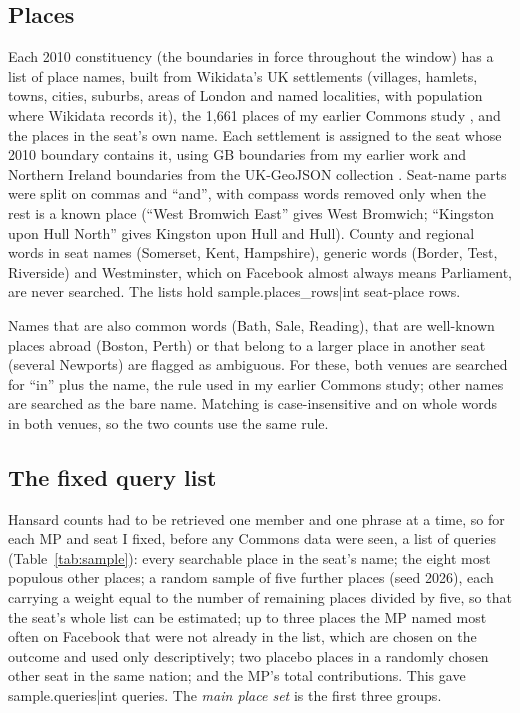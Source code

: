 \documentclass[11pt,a4paper]{article}
\begin{document}
\subsection{Places}
Each 2010 constituency (the boundaries in force throughout the window) has a list of place names, built from Wikidata's UK settlements \citep{wikidata2026} (villages, hamlets, towns, cities, suburbs, areas of London and named localities, with population where Wikidata records it), the 1,661 places of my earlier Commons study \citep{hotham2026a}, and the places in the seat's own name. Each settlement is assigned to the seat whose 2010 boundary contains it, using GB boundaries from my earlier work and Northern Ireland boundaries from the UK-GeoJSON collection \citep{ukgeojson}. Seat-name parts were split on commas and ``and'', with compass words removed only when the rest is a known place (``West Bromwich East'' gives West Bromwich; ``Kingston upon Hull North'' gives Kingston upon Hull and Hull). County and regional words in seat names (Somerset, Kent, Hampshire), generic words (Border, Test, Riverside) and Westminster, which on Facebook almost always means Parliament, are never searched. The lists hold {{sample.places_rows|int}} seat-place rows.

Names that are also common words (Bath, Sale, Reading), that are well-known places abroad (Boston, Perth) or that belong to a larger place in another seat (several Newports) are flagged as ambiguous. For these, both venues are searched for ``in'' plus the name, the rule used in my earlier Commons study; other names are searched as the bare name. Matching is case-insensitive and on whole words in both venues, so the two counts use the same rule.

\subsection{The fixed query list}
Hansard counts had to be retrieved one member and one phrase at a time, so for each MP and seat I fixed, before any Commons data were seen, a list of queries (Table~\ref{tab:sample}): every searchable place in the seat's name; the eight most populous other places; a random sample of five further places (seed 2026), each carrying a weight equal to the number of remaining places divided by five, so that the seat's whole list can be estimated; up to three places the MP named most often on Facebook that were not already in the list, which are chosen on the outcome and used only descriptively; two placebo places in a randomly chosen other seat in the same nation; and the MP's total contributions. This gave {{sample.queries|int}} queries. The \textit{main place set} is the first three groups.
\end{document}
